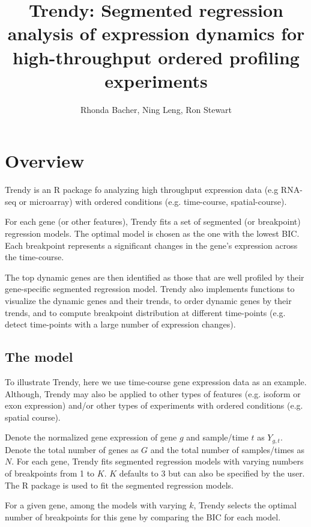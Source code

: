 \documentclass{article}
\begin{document}
\title{Trendy: Segmented regression analysis of
expression dynamics for high-throughput ordered
profiling experiments}
\author{Rhonda Bacher, Ning Leng, Ron Stewart}
\maketitle
\tableofcontents
\setcounter{tocdepth}{2}



\section{Overview}
\label{sec:intro}
Trendy is an R package fo analyzing high throughput expression data 
(e.g RNA-seq or microarray) with ordered conditions 
(e.g. time-course, spatial-course).

For each gene (or other features), Trendy fits a set of segmented 
(or breakpoint) regression models. The optimal model is chosen as 
the one with the lowest BIC. Each breakpoint represents a significant 
changes in the gene's expression across the time-course.

The top dynamic genes are then identified as those that are well 
profiled by their gene-specific segmented regression model. Trendy also
implements functions to visualize the dynamic genes and their trends, 
to order dynamic genes by their trends, and to compute breakpoint distribution
at different
time-points (e.g. detect time-points with a large number of expression 
changes).

\subsection{The model}
To illustrate Trendy, here we use time-course gene expression data as an 
example. Although, Trendy may also be applied to other types of features
(e.g. isoform or exon expression) and/or other types of experiments with
ordered conditions (e.g. spatial course).

Denote the normalized gene expression of gene $g$ and sample/time $t$ 
as $Y_{g,t}$.
Denote the total number of genes as $G$ and the total number of samples/times
as $N$.
For each gene, Trendy fits segmented regression models with varying numbers of
breakpoints from 1 to $K$. $K$ defaults to 3 but can also be specified by the
user. The  R package is used to fit the segmented 
regression models.

For a given gene, among the models with varying $k$, Trendy selects the 
optimal
number of breakpoints for this gene by comparing the BIC for each model.
\end{document}
